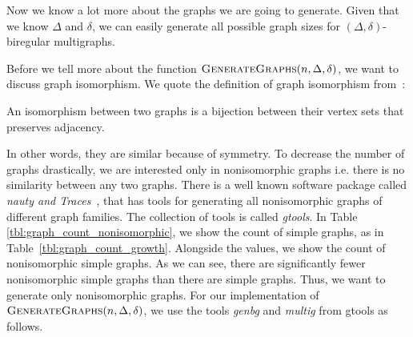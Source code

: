 Now we know a lot more about the graphs we are going to generate.
Given that we know $\Delta$ and $\delta$, we can easily generate all possible graph sizes for $(\Delta, \delta)$-biregular multigraphs.

Before we tell more about the function $\textsc{GenerateGraphs}(n, \Delta, \delta)$, we want to discuss graph isomorphism.
We quote the definition of graph isomorphism from~\cite{DBLP:journals/jsc/McKayP14}:
\begin{displayquote}
An isomorphism between two graphs is a bijection between their vertex sets that preserves adjacency.
\end{displayquote}
In other words, they are similar because of symmetry.
To decrease the number of graphs drastically, we are interested only in nonisomorphic graphs i.e. there is no similarity between any two graphs.
There is a well known software package called \emph{nauty and Traces}~\cite{DBLP:journals/jsc/McKayP14}, that has tools for generating all nonisomorphic graphs of different graph families.
The collection of tools is called \emph{gtools}.
In Table \ref{tbl:graph_count_nonisomorphic}, we show the count of simple graphs, as in Table~\ref{tbl:graph_count_growth}.
Alongside the values, we show the count of nonisomorphic simple graphs.
As we can see, there are significantly fewer nonisomorphic simple graphs than there are simple graphs.
Thus, we want to generate only nonisomorphic graphs.
For our implementation of $\textsc{GenerateGraphs}(n, \Delta, \delta)$, we use the tools \emph{genbg} and \emph{multig} from gtools as follows.

